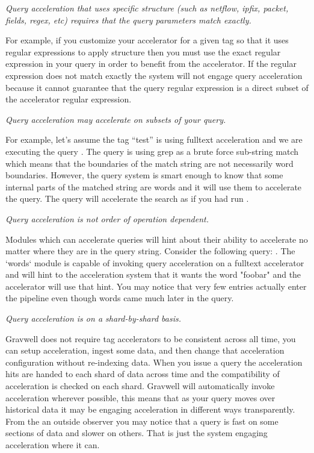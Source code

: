 {\textit{Query acceleration that uses specific structure (such as netflow, ipfix, packet, fields, regex, etc) requires that the query parameters match exactly.}

For example, if you customize your accelerator for a given tag so that it uses regular expressions to apply structure then you must use the exact regular expression in your query in order to benefit from the accelerator.  If the regular expression does not match exactly the system will not engage query acceleration because it cannot guarantee that the query regular expression is a direct subset of the accelerator regular expression.

\textit{Query acceleration may accelerate on subsets of your query.}

For example, let's assume the tag ``test'' is using fulltext acceleration and we are executing the query .  The query is using grep as a brute force sub-string match which means that the boundaries of the match string are not necessarily word boundaries.  However, the query system is smart enough to know that some internal parts of the matched string are words and it will use them to accelerate the query.  The query will accelerate the search as if you had run .

\textit{Query acceleration is not order of operation dependent.}

Modules which can accelerate queries will hint about their ability to accelerate no matter where they are in the query string.  Consider the following query: .  The `words` module is capable of invoking query acceleration on a fulltext accelerator and will hint to the acceleration system that it wants the word "foobar" and the accelerator will use that hint.  You may notice that very few entries actually enter the pipeline even though words came much later in the query.

\textit{Query acceleration is on a shard-by-shard basis.}

Gravwell does not require tag accelerators to be consistent across all time, you can setup acceleration, ingest some data, and then change that acceleration configuration without re-indexing data.  When you issue a query the acceleration hits are handed to each shard of data across time and the compatibility of acceleration is checked on each shard.  Gravwell will automatically invoke acceleration wherever possible, this means that as your query moves over historical data it may be engaging acceleration in different ways transparently.  From the an outside observer you may notice that a query is fast on some sections of data and slower on others.  That is just the system engaging acceleration where it can.

}
